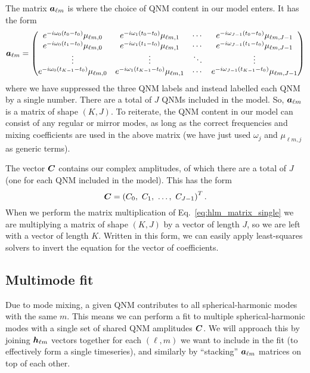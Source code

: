 The matrix $\vb*{a}_{\ell m}$ is where the choice of QNM content in our model enters. 
It has the form
\begin{equation}
    \vb*{a}_{\ell m} = 
    \begin{pmatrix}
    e^{-i \omega_0 (t_0 - t_0)} \mu_{\ell m,0} & e^{-i \omega_1 (t_0 - t_0)} \mu_{\ell m,1} & \cdots & e^{-i \omega_{J-1} (t_0 - t_0)} \mu_{\ell m,J-1} \\ 
    e^{-i \omega_0 (t_1 - t_0)} \mu_{\ell m,0} & e^{-i \omega_1 (t_1 - t_0)} \mu_{\ell m,1} & \cdots & e^{-i \omega_{J-1} (t_1 - t_0)} \mu_{\ell m,J-1} \\ 
    \vdots & \vdots & \ddots & \vdots \\
    e^{-i \omega_0 (t_{K-1} - t_0)} \mu_{\ell m,0} & e^{-i \omega_1 (t_{K-1} - t_0)} \mu_{\ell m,1} & \cdots & e^{-i \omega_{J-1} (t_{K-1} - t_0)} \mu_{\ell m,J-1}
    \end{pmatrix}
\end{equation}
where we have suppressed the three QNM labels and instead labelled each QNM by a single number. 
There are a total of $J$ QNMs included in the model.
So, $\vb*{a}_{\ell m}$ is a matrix of shape $(K, J)$.
To reiterate, the QNM content in our model can consist of any regular or mirror modes, as long as the correct frequencies and mixing coefficients are used in the above matrix (we have just used $\omega_j$ and $\mu_{\ell m, j}$ as generic terms). 

The vector $\vb*{C}$ contains our complex amplitudes, of which there are a total of $J$ (one for each QNM included in the model). This has the form
\begin{equation}
    \vb*{C} = \left(C_0,\ C_1,\ \ldots,\ C_{J-1}\right)^T.
\end{equation}
When we perform the matrix multiplication of Eq.~\ref{eq:hlm_matrix_single} we are multiplying a matrix of shape $(K,J)$ by a vector of length $J$, so we are left with a vector of length $K$.
Written in this form, we can easily apply least-squares solvers to invert the equation for the vector of coefficients. 

\subsection{Multimode fit}

Due to mode mixing, a given QNM contributes to all spherical-harmonic modes with the same $m$. 
This means we can perform a fit to multiple spherical-harmonic modes with a single set of shared QNM amplitudes $\vb*{C}$.
We will approach this by joining $\vb*{h}_{\ell m}$ vectors together for each $(\ell, m)$ we want to include in the fit (to effectively form a single timeseries), and similarly by ``stacking'' $\vb*{a}_{\ell m}$ matrices on top of each other.

